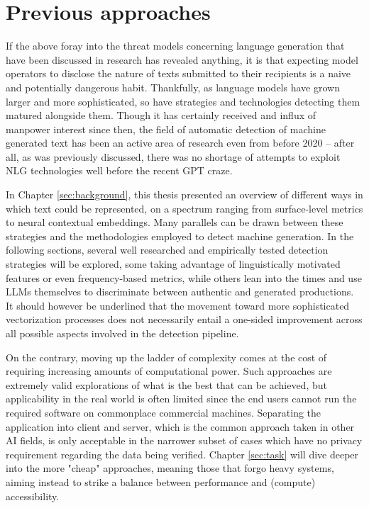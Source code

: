 \section{Previous approaches}
\label{sec:approaches}

If the above foray into the threat models concerning language generation that have been discussed in research has revealed anything, it is that expecting model operators to disclose the nature of texts submitted to their recipients is a naive and potentially dangerous habit.
Thankfully, as language models have grown larger and more sophisticated, so have strategies and technologies detecting them matured alongside them.
Though it has certainly received and influx of manpower interest since then, the field of automatic detection of machine generated text has been an active area of research even from before 2020 -- after all, as was previously discussed, there was no shortage of attempts to exploit NLG technologies well before the recent GPT craze.

In Chapter \ref{sec:background}, this thesis presented an overview of different ways in which text could be represented, on a spectrum ranging from surface-level metrics to neural contextual embeddings.
Many parallels can be drawn between these strategies and the methodologies employed to detect machine generation.
In the following sections, several well researched and empirically tested detection strategies will be explored, some taking advantage of linguistically motivated features or even frequency-based metrics, while others lean into the times and use LLMs themselves to discriminate between authentic and generated productions.
It should however be underlined that the movement toward more sophisticated vectorization processes does not necessarily entail a one-sided improvement across all possible aspects involved in the detection pipeline.

On the contrary, moving up the ladder of complexity comes at the cost of requiring increasing amounts of computational power.
Such approaches are extremely valid explorations of what is the best that can be achieved, but applicability in the real world is often limited since the end users cannot run the required software on commonplace commercial machines.
Separating the application into client and server, which is the common approach taken in other AI fields, is only acceptable in the narrower subset of cases which have no privacy requirement regarding the data being verified.
Chapter \ref{sec:task} will dive deeper into the more "cheap" approaches, meaning those that forgo heavy systems, aiming instead to strike a balance between performance and (compute) accessibility.

